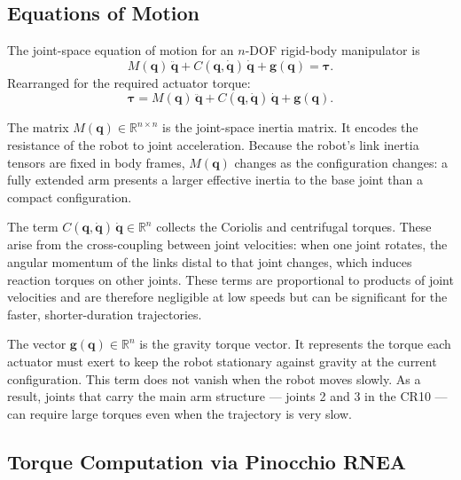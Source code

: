 \documentclass[12pt,a4paper]{article}
\begin{document}
\subsection{Equations of Motion}
\label{sec:eom}

The joint-space equation of motion for an $n$-DOF rigid-body manipulator is
\begin{equation}
    M(\bm{q})\,\ddot{\bm{q}}
    + C(\bm{q},\dot{\bm{q}})\,\dot{\bm{q}}
    + \bm{g}(\bm{q}) = \bm{\tau}.
    \label{eq:eom}
\end{equation}
Rearranged for the required actuator torque:
\begin{equation}
    \bm{\tau} = M(\bm{q})\,\ddot{\bm{q}}
              + C(\bm{q},\dot{\bm{q}})\,\dot{\bm{q}}
              + \bm{g}(\bm{q}).
    \label{eq:tau}
\end{equation}

The matrix $M(\bm{q}) \in \mathbb{R}^{n \times n}$ is the joint-space inertia matrix. It
encodes the resistance of the robot to joint acceleration. Because the robot's link inertia
tensors are fixed in body frames, $M(\bm{q})$ changes as the configuration changes: a fully
extended arm presents a larger effective inertia to the base joint than a compact configuration.

The term $C(\bm{q},\dot{\bm{q}})\,\dot{\bm{q}} \in \mathbb{R}^{n}$ collects the Coriolis and
centrifugal torques. These arise from the cross-coupling between joint velocities: when one
joint rotates, the angular momentum of the links distal to that joint changes, which induces
reaction torques on other joints. These terms are proportional to products of joint velocities
and are therefore negligible at low speeds but can be significant for the faster,
shorter-duration trajectories.

The vector $\bm{g}(\bm{q}) \in \mathbb{R}^{n}$ is the gravity torque vector. It represents
the torque each actuator must exert to keep the robot stationary against gravity at the current
configuration. This term does not vanish when the robot moves slowly. As a result, joints that
carry the main arm structure --- joints 2 and 3 in the CR10 --- can require large torques even
when the trajectory is very slow.

\subsection{Torque Computation via Pinocchio RNEA}
\label{sec:rnea}
\end{document}
